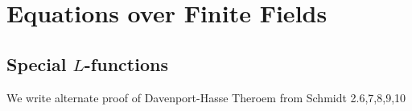 \chapter{Equations over Finite Fields}

\section{Special $L$-functions}

We write alternate proof of Davenport-Hasse Theroem from Schmidt 2.{6,7,8,9,10}